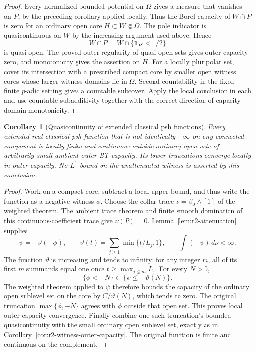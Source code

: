 \documentclass[11pt,a4paper]{article}
\numberwithin{equation}{section}
\newtheorem{corollary}[theorem]{Corollary}
\theoremstyle{definition}
\theoremstyle{remark}
\begin{document}
\begin{proof}
Every normalized bounded potential on $\Omega$ gives a measure
that vanishes on $P$, by the preceding corollary applied locally.
Thus the Borel capacity of $W\cap P$ is zero for an ordinary
open core $H\subset W\Subset\Omega$.
The pole indicator is quasicontinuous on $W$ by the increasing
argument used above. Hence
\[
 W\cap P=W\cap\{\mathbf1_{P^c}<1/2\}
\]
is quasi-open. The proved outer regularity of quasi-open sets
gives outer capacity zero, and monotonicity gives the assertion
on $H$. For a locally pluripolar set, cover its intersection
with a prescribed compact core by smaller open witness cores
whose larger witness domains lie in $\Omega$. Second
countability in the fixed finite $p$-adic setting gives a
countable subcover. Apply the local conclusion in each and
use countable subadditivity together with the correct direction
of capacity domain monotonicity.
\end{proof}

\begin{corollary}[Quasicontinuity of extended classical psh functions]
\label{cor:r2-extended-psh-qc}
Every extended-real classical psh function that is not identically
$-\infty$ on any connected component is locally finite and
continuous outside ordinary open sets of arbitrarily small
ambient outer BT capacity. Its lower truncations converge
locally in outer capacity. No $L^1$ bound on the unattenuated
witness is asserted by this conclusion.
\end{corollary}

\begin{proof}
Work on a compact core, subtract a local upper bound, and thus
write the function as a negative witness $\phi$. Choose the
collar trace $\nu=\beta_0\wedge[1]$ of the weighted theorem.
The ambient trace theorem and finite smooth domination of this
continuous-coefficient trace give $\nu(P)=0$.
Lemma~\ref{lem:r2-attenuation} supplies
\[
 \psi=-\vartheta(-\phi),\qquad
 \vartheta(t)=\sum_{j\geq1}\min\{t/L_j,1\},
 \qquad \int(-\psi)\,d\nu<\infty.
\]
The function $\vartheta$ is increasing and tends to infinity:
for any integer $m$, all of its first $m$ summands equal one
once $t\geq\max_{j\leq m}L_j$.
For every $N>0$,
\[
 \{\phi<-N\}\subset\{\psi\leq-\vartheta(N)\}.
\]
The weighted theorem applied to $\psi$ therefore bounds the
capacity of the ordinary open sublevel set on the core by
$C/\vartheta(N)$, which tends to zero. The original truncation
$\max\{\phi,-N\}$ agrees with $\phi$ outside that open set.
This proves local outer-capacity convergence. Finally combine
one such truncation's bounded quasicontinuity with the small
ordinary open sublevel set, exactly as in
Corollary~\ref{cor:r2-witness-outer-capacity}. The original
function is finite and continuous on the complement.
\end{proof}
\end{document}
